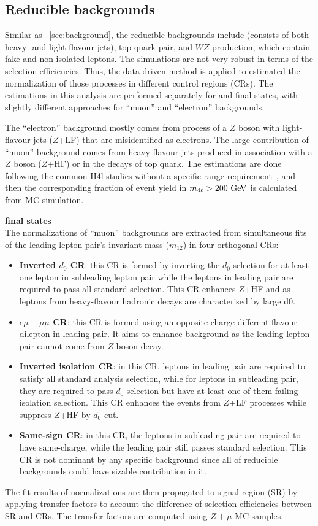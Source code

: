 \subsection{Reducible backgrounds}
Similar as ~\ref{sec:background}, the reducible backgrounds include \Zjet (consists of both heavy- and light-flavour jets), top quark pair, and $WZ$ production, which contain fake and non-isolated leptons.
The simulations are not very robust in terms of the selection efficiencies.
Thus, the data-driven method is applied to estimated the normalization of those processes in different control regions (CRs).
The estimations in this analysis are performed separately for \llmumu and \llee final states, with slightly different approaches for ``muon'' and ``electron'' backgrounds.

The ``electron'' background mostly comes from process of a $Z$ boson with light-flavour jets ($Z$+LF) that are misidentified as electrons.
The large contribution of ``muon'' background comes from heavy-flavour jets produced in association with a $Z$ boson ($Z$+HF) or in the decays of top quark.
The estimations are done following the common H4l studies without a specific \mfl range requirement~\cite{PhysRevD.91.012006}, and then the corresponding fraction of event yield in $m_{4\ell} > 200~\text{Ge\kern -0.1em V}$ is calculated from MC simulation.

\textbf{\llmumu final states} \\
The normalizations of ``muon'' backgrounds are extracted from simultaneous fits of the leading lepton pair's invariant mass ($m_{12}$) in four orthogonal CRs:
\begin{itemize}
	\item \textbf{Inverted $d_{0}$ CR}: this CR is formed by inverting the $d_{0}$ selection for at least one lepton in subleading lepton pair while the leptons in leading pair are required to pass all standard selection.
This CR enhances $Z$+HF and \ttbar as leptons from heavy-flavour hadronic decays are characterised by large d0.
	\item \textbf{$e\mu+\mu\mu$ CR}: this CR is formed using an opposite-charge different-flavour dilepton in leading pair.
It aims to enhance \ttbar background as the leading lepton pair cannot come from $Z$ boson decay.
	\item \textbf{Inverted isolation CR}: in this CR, leptons in leading pair are required to satisfy all standard analysis selection, while for leptons in subleading pair, they are required to pass $d_{0}$ selection but have at least one of them failing isolation selection.
This CR enhances the events from $Z$+LF processes while suppress $Z$+HF by $d_{0}$ cut.
	\item \textbf{Same-sign CR}: in this CR, the leptons in subleading pair are required to have same-charge, while the leading pair still passes standard selection.
This CR is not dominant by any specific background since all of reducible backgrounds could have sizable contribution in it.
\end{itemize}
The fit results of normalizations are then propagated to signal region (SR) by applying transfer factors to account the difference of selection efficiencies between SR and CRs.
The transfer factors are computed using $Z+\mu$ MC samples.


